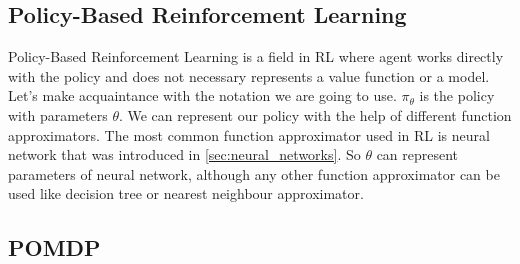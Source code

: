 










\subsection{Policy-Based Reinforcement Learning}
Policy-Based Reinforcement Learning is a field in RL where agent works directly
with the policy and does not necessary represents a value function or a model.
Let's make acquaintance with the notation we are going to use.
$\pi_{\theta}$ is the policy with parameters $\theta$. We can represent our policy
with the help of different function approximators. The most common function
approximator used in RL is neural network that was introduced in \autoref{sec:neural_networks}.
So $\theta$ can represent parameters of neural network, although any other function approximator
can be used like decision tree or nearest neighbour approximator.



\subsection{POMDP} \label{subs:POMDP}




%

